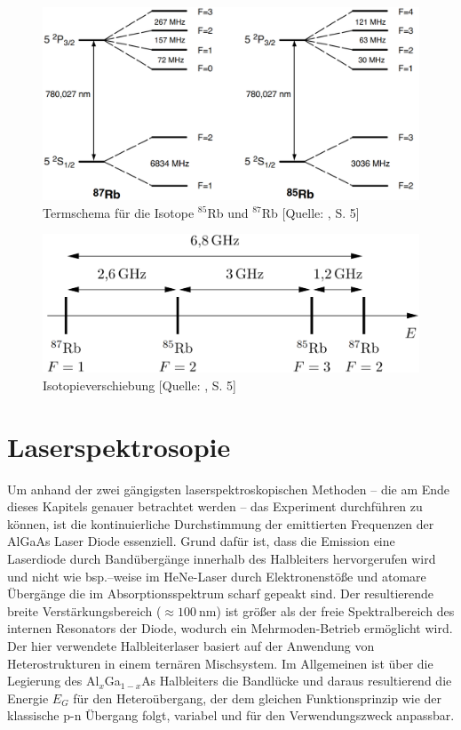 \begin{figure}[!h]
    \centering
    \includegraphics[scale = 0.45]{figures/images/termschema.png}
    \caption{Termschema für die Isotope $^{85}$Rb und $^{87}$Rb [Quelle: \cite{Krükow}, S. 5]}
    \label{fig:termschema}
\end{figure}

\begin{figure}
    \centering
    \includegraphics[scale = 0.28]{figures/images/isotopieverschiebung.png}
    \caption{Isotopieverschiebung [Quelle: \cite{Krükow}, S. 5]}
    \label{fig:isotopieverschiebung}
\end{figure}

\section{Laserspektrosopie}


 \noindent Um anhand der zwei gängigsten laserspektroskopischen Methoden -- die am Ende dieses Kapitels genauer betrachtet werden -- das Experiment durchführen zu können, ist die kontinuierliche Durchstimmung der emittierten Frequenzen der AlGaAs Laser Diode essenziell. Grund dafür ist, dass die Emission eine Laserdiode durch Bandübergänge innerhalb des Halbleiters hervorgerufen wird und nicht wie bsp.--weise im HeNe-Laser durch Elektronenstöße und atomare Übergänge die im Absorptionsspektrum scharf gepeakt sind. Der resultierende breite Verstärkungsbereich ($\approx \SI{100}{\nano \meter}$) ist größer als der freie Spektralbereich des internen Resonators der Diode, wodurch ein Mehrmoden-Betrieb ermöglicht wird. Der hier verwendete Halbleiterlaser basiert auf der Anwendung von Heterostrukturen in einem ternären Mischsystem. Im Allgemeinen ist über die Legierung des Al$_{x}$Ga$_{1-x}$As Halbleiters die Bandlücke und daraus resultierend die Energie $E_{G}$ für den Heteroübergang, der dem gleichen Funktionsprinzip wie der klassische p-n Übergang folgt, variabel und für den Verwendungszweck anpassbar. \cite{Hunkl}\\

